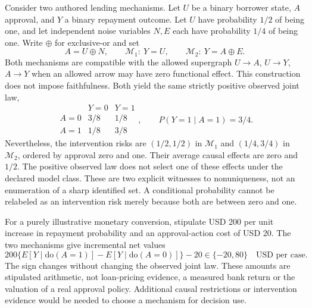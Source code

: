 Consider two authored lending mechanisms. Let $U$ be a binary borrower state,
$A$ approval, and $Y$ a binary repayment outcome. Let $U$ have probability
$1/2$ of being one, and let independent noise variables $N,E$ each have
probability $1/4$ of being one. Write $\oplus$ for exclusive-or and set
\begin{equation}
 A=U\oplus N,\qquad
 \mathcal M_1:\ Y=U,\qquad
 \mathcal M_2:\ Y=A\oplus E.
 \label{exec19:javaid-models}
\end{equation}
Both mechanisms are compatible with the allowed supergraph
$U\to A$, $U\to Y$, $A\to Y$ when an allowed arrow may have zero functional
effect. This construction does not impose faithfulness. Both yield the same
strictly positive observed joint law,
\begin{equation}
 \begin{array}{c|cc}
  &Y=0&Y=1\\\hline
 A=0&3/8&1/8\\
 A=1&1/8&3/8
 \end{array},
 \qquad P(Y=1\mid A=1)=3/4.
 \label{exec19:javaid-law}
\end{equation}
Nevertheless, the intervention risks are $(1/2,1/2)$ in $\mathcal M_1$ and
$(1/4,3/4)$ in $\mathcal M_2$, ordered by approval zero and one. Their average
causal effects are zero and $1/2$. The positive observed law does not select
one of these effects under the declared model class. These are two explicit
witnesses to nonuniqueness, not an enumeration of a sharp identified set. A
conditional probability cannot be relabeled as an intervention risk merely
because both are between zero and one.~\citep{exec19_javaid_reference}

For a purely illustrative monetary conversion, stipulate USD 200 per unit
increase in repayment probability and an approval-action cost of USD 20. The
two mechanisms give incremental net values
\begin{equation}
 200\{E[Y\mid\mathrm{do}(A=1)]-E[Y\mid\mathrm{do}(A=0)]\}-20
 \in\{-20,80\}\quad\text{USD per case}.
 \label{exec19:javaid-money}
\end{equation}
The sign changes without changing the observed joint law. These amounts are
stipulated arithmetic, not loan-pricing evidence, a measured bank return or
the valuation of a real approval policy. Additional causal restrictions or
intervention evidence would be needed to choose a mechanism for decision use.
\citep{exec19_javaid_reference}

